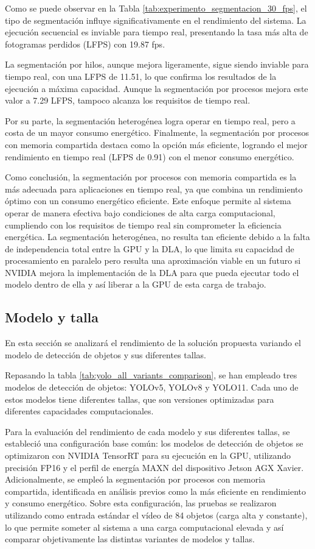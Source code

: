 \documentclass[11pt,spanish,listoffigures,listoftables]{tfgetsinf}
\begin{document}
Como se puede observar en la Tabla \ref{tab:experimento_segmentacion_30_fps}, el tipo de segmentación influye significativamente en el rendimiento del sistema. La ejecución secuencial es inviable para tiempo real, presentando la tasa más alta de fotogramas perdidos (LFPS) con 19.87 fps.

La segmentación por hilos, aunque mejora ligeramente, sigue siendo inviable para tiempo real, con una LFPS de 11.51, lo que confirma los resultados de la ejecución a máxima capacidad. Aunque la segmentación por procesos mejora este valor a 7.29 LFPS, tampoco alcanza los requisitos de tiempo real.

Por su parte, la segmentación heterogénea logra operar en tiempo real, pero a costa de un mayor consumo energético. Finalmente, la segmentación por procesos con memoria compartida destaca como la opción más eficiente, logrando el mejor rendimiento en tiempo real (LFPS de 0.91) con el menor consumo energético.

Como conclusión, la segmentación por procesos con memoria compartida es la más adecuada para aplicaciones en tiempo real, ya que combina un rendimiento óptimo con un consumo energético eficiente. Este enfoque permite al sistema operar de manera efectiva bajo condiciones de alta carga computacional, cumpliendo con los requisitos de tiempo real sin comprometer la eficiencia energética. La segmentación heterogénea, no resulta tan eficiente debido a la falta de independencia total entre la GPU y la DLA, lo que limita su capacidad de procesamiento en paralelo pero resulta una aproximación viable en un futuro si NVIDIA mejora la implementación de la DLA para que pueda ejecutar todo el modelo dentro de ella y así liberar a la GPU de esta carga de trabajo.

\subsection{Modelo y talla} \label{sub:modelo_talla}
En esta sección se analizará el rendimiento de la solución propuesta variando el modelo de detección de objetos y sus diferentes tallas.

Repasando la tabla \ref{tab:yolo_all_variants_comparison}, se han empleado tres modelos de detección de objetos: YOLOv5, YOLOv8 y YOLO11. Cada uno de estos modelos tiene diferentes tallas, que son versiones optimizadas para diferentes capacidades computacionales. 

Para la evaluación del rendimiento de cada modelo y sus diferentes tallas, se estableció una configuración base común: los modelos de detección de objetos se optimizaron con NVIDIA TensorRT para su ejecución en la GPU, utilizando precisión FP16 y el perfil de energía MAXN del dispositivo Jetson AGX Xavier. Adicionalmente, se empleó la segmentación por procesos con memoria compartida, identificada en análisis previos como la más eficiente en rendimiento y consumo energético. Sobre esta configuración, las pruebas se realizaron utilizando como entrada estándar el vídeo de 84 objetos (carga alta y constante), lo que permite someter al sistema a una carga computacional elevada y así comparar objetivamente las distintas variantes de modelos y tallas.
\end{document}
